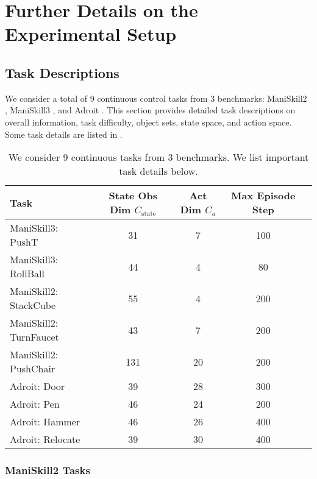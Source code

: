 \section{Further Details on the Experimental Setup}
\label{sup:more_exp_setup}

\subsection{Task Descriptions}
\label{sup:task_descriptions}
We consider a total of 9 continuous control tasks from 3 benchmarks: ManiSkill2 \citep{gu2023maniskill2}, ManiSkill3 \citep{tao2024maniskill3}, and Adroit \citep{rajeswaran2017learning}. This section provides detailed task descriptions on overall information, task difficulty, object sets, state space, and action space. Some task details are listed in .

\begin{table}[!ht]
\caption{We consider 9 continuous tasks from 3 benchmarks. We list important task details below.}
\label{table:tasks}
\setlength{\tabcolsep}{3.5pt}
\begin{center}
{{
\begin{tabular}{lcccc}
\toprule[1pt]
\textbf{Task}
& \textbf{State Obs Dim $C_{\mathrm{state}}$}
& \textbf{Act Dim $C_a$}
& \textbf{Max Episode Step}
\\
\midrule
ManiSkill3: PushT      & 31 & 7  & 100 \\
ManiSkill3: RollBall   & 44 & 4  & 80 \\
ManiSkill2: StackCube  & 55    & 4  & 200 \\
ManiSkill2: TurnFaucet & 43    & 7  & 200 \\
ManiSkill2: PushChair  & 131   & 20 & 200 \\
Adroit: Door       & 39    & 28 & 300 \\
Adroit: Pen        & 46    & 24 & 200 \\
Adroit: Hammer     & 46    & 26 & 400 \\
Adroit: Relocate   & 39    & 30 & 400 \\
\bottomrule[1pt]
\end{tabular}
}}
\end{center}
\vspace{-12pt}
\end{table}

\subsubsection{ManiSkill2 Tasks}


